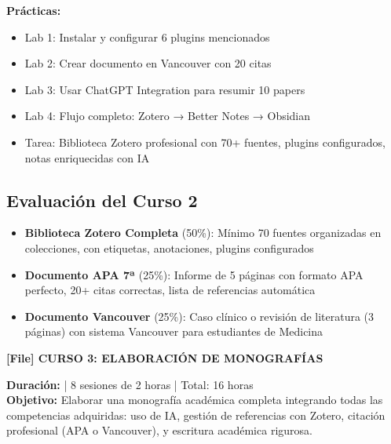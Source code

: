 \documentclass[12pt,a4paper]{yaac-luatex}
\newcommand{\faFileAlt}{[File]}
\newcommand{\cursotitulo}[2]{
	\vspace{0.5cm}
	\begin{tcolorbox}[
		enhanced,
		colback=#1,
		colframe=#1,
		arc=5pt,
		boxrule=0pt,
		left=12pt,
		right=12pt,
		top=10pt,
		bottom=10pt
		]
		{\color{white}\Large\bfseries #2}
	\end{tcolorbox}
}
\begin{document}
\begin{tcolorbox}[
		enhanced,
		colback=white,
		colframe=curso2color,
		arc=3pt,
		boxrule=1.5pt,
		left=10pt,
		right=10pt,
		top=8pt,
		bottom=8pt,
		breakable
		]
		\textbf{Prácticas:}
		\begin{itemize}[leftmargin=*, itemsep=0.1cm]
			\item Lab 1: Instalar y configurar 6 plugins mencionados
			\item Lab 2: Crear documento en Vancouver con 20 citas
			\item Lab 3: Usar ChatGPT Integration para resumir 10 papers
			\item Lab 4: Flujo completo: Zotero → Better Notes → Obsidian
			\item Tarea: Biblioteca Zotero profesional con 70+ fuentes, plugins configurados, notas enriquecidas con IA
		\end{itemize}
	\end{tcolorbox}
	
	\vspace{0.5cm}
	
	\subsection*{Evaluación del Curso 2}
	
	\begin{itemize}[leftmargin=*, itemsep=0.2cm]
		\item \textbf{Biblioteca Zotero Completa} (50\%): Mínimo 70 fuentes organizadas en colecciones, con etiquetas, anotaciones, plugins configurados
		\item \textbf{Documento APA 7ª} (25\%): Informe de 5 páginas con formato APA perfecto, 20+ citas correctas, lista de referencias automática
		\item \textbf{Documento Vancouver} (25\%): Caso clínico o revisión de literatura (3 páginas) con sistema Vancouver para estudiantes de Medicina
	\end{itemize}
	
	\newpage
	
	
	\cursotitulo{curso3color}{\faFileAlt \hspace{0.5em} CURSO 3: ELABORACIÓN DE MONOGRAFÍAS}
	
	\vspace{0.3cm}
	
	\begin{tcolorbox}[
		enhanced,
		colback=white,
		colframe=curso3color,
		arc=3pt,
		boxrule=2pt,
		breakable
		]
		\textbf{Duración:}  | 8 sesiones de 2 horas | Total: 16 horas\\[0.2cm]
		\textbf{Objetivo:} Elaborar una monografía académica completa integrando todas las competencias adquiridas: uso de IA, gestión de referencias con Zotero, citación profesional (APA o Vancouver), y escritura académica rigurosa.
	\end{tcolorbox}
	
\end{document}
